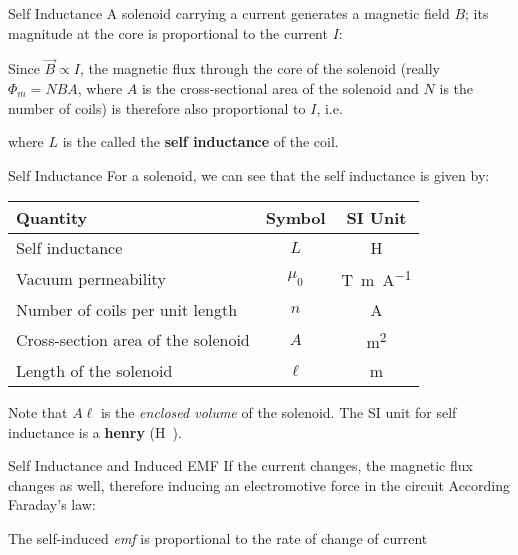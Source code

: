 \documentclass[12pt,aspectratio=169]{beamer}
\begin{document}
\begin{frame}{Self Inductance}
  A solenoid carrying a current generates a magnetic field $B$; its magnitude at
  the core is proportional to the current $I$:


  Since $\vec B\propto I$, the magnetic flux through the core of the solenoid
  (really $\Phi_m=NBA$, where $A$ is the cross-sectional area of the solenoid
  and $N$ is the number of coils) is therefore also proportional to $I$, i.e.


  where $L$ is the called the \textbf{self inductance} of the coil.
\end{frame}



\begin{frame}{Self Inductance}
  For a solenoid, we can see that the self inductance is given by:


  \begin{center}
    \begin{tabular}{l|c|c}
      \rowcolor{pink}
      \textbf{Quantity} & \textbf{Symbol} & \textbf{SI Unit} \\ \hline
      Self inductance                    & $L$     & \si\henry\\
      Vacuum permeability      & $\mu_0$ & \si{\tesla.\metre\per\ampere} \\
      Number of coils per unit length    & $n$     & \si\ampere \\
      Cross-section area of the solenoid & $A$     & \si{\metre\squared} \\
      Length of the solenoid             & $\ell$  & \si\metre
    \end{tabular}
  \end{center}
  Note that $A\ell$ is the \emph{enclosed volume} of the solenoid. The SI unit
  for self inductance is a \textbf{henry} (\si\henry).
\end{frame}



\begin{frame}{Self Inductance and Induced EMF}
  If the current changes, the magnetic flux changes as well, therefore inducing
  an electromotive force in the circuit According Faraday's law:


  The self-induced \emph{emf} is proportional to the rate of change of current
\end{frame}
\end{document}
